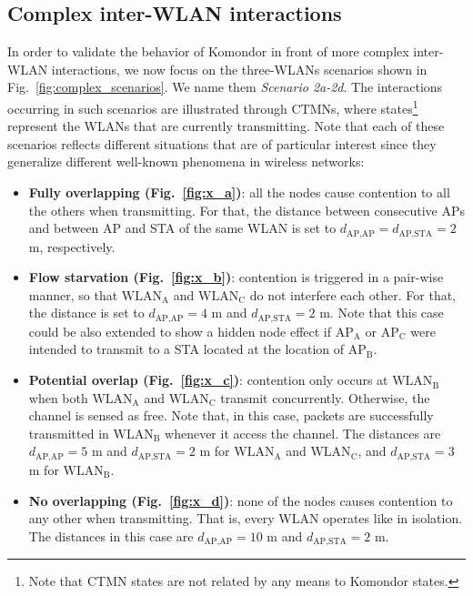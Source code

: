 \documentclass{article}
\begin{document}
	\subsection{Complex inter-WLAN interactions}
	\label{section:complex_scenarios}
	In order to validate the behavior of Komondor in front of more complex inter-WLAN interactions, we now focus on the three-WLANs scenarios shown in Fig.~\ref{fig:complex_scenarios}. We name them \textit{Scenario 2a-2d}. The interactions occurring in such scenarios are illustrated through CTMNs, where states\footnote[6]{Note that CTMN states are not related by any means to Komondor states.} represent the WLANs that are currently transmitting. Note that each of these scenarios reflects different situations that are of particular interest since they generalize different well-known phenomena in wireless networks:
	\begin{itemize}
		
		\item \textbf{Fully overlapping (Fig.~\ref{fig:x_a})}: all the nodes cause contention to all the others when transmitting. For that, the distance between consecutive APs and between AP and STA of the same WLAN is set to $d_{\text{AP,AP}} = d_{\text{AP,STA}} = 2$ m, respectively.
		
		\item \textbf{Flow starvation (Fig.~\ref{fig:x_b})}: contention is triggered in a pair-wise manner, so that $\text{WLAN}_\text{A}$ and $\text{WLAN}_\text{C}$ do not interfere each other. For that, the distance is set to $d_{\text{AP,AP}} = 4$ m and $d_{\text{AP,STA}} = 2$ m. Note that this case could be also extended to show a hidden node effect if $\text{AP}_\text{A}$ or $\text{AP}_\text{C}$ were intended to transmit to a STA located at the location of $\text{AP}_\text{B}$.
		
		\item \textbf{Potential overlap (Fig.~\ref{fig:x_c})}:
		contention only occurs at $\text{WLAN}_\text{B}$ when both $\text{WLAN}_\text{A}$ and $\text{WLAN}_\text{C}$ transmit concurrently. Otherwise, the channel is sensed as free. Note that, in this case, packets are successfully transmitted in $\text{WLAN}_\text{B}$ whenever it access the channel. The distances are $d_{\text{AP,AP}} = 5$ m and $d_{\text{AP,STA}} = 2$ m for $\text{WLAN}_\text{A}$ and $\text{WLAN}_\text{C}$, and $d_{\text{AP,STA}} = 3$ m for $\text{WLAN}_\text{B}$.
		
		\item \textbf{No overlapping (Fig.~\ref{fig:x_d})}: none of the nodes causes contention to any other when transmitting. That is, every WLAN operates like in isolation. The distances in this case are $d_{\text{AP,AP}} = 10$ m and $d_{\text{AP,STA}} = 2$ m.
	\end{itemize}
	
\end{document}
